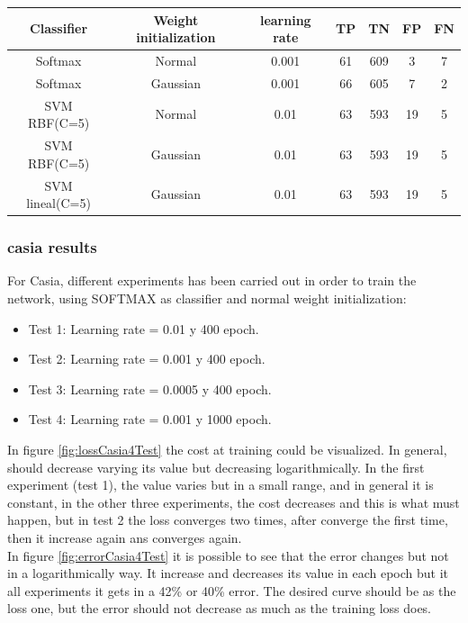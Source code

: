 \begin{table}[htb]
\centering
\label{fravv}
\begin{tabular}{|ccccccc|}
\hline
Classifier &  Weight initialization & learning rate & TP  & TN  & FP  & FN \\ \hline
Softmax    &         Normal        &     0.001     & 61  & 609 &  3  & 7  \\
Softmax    &       Gaussian        &     0.001     & 66  & 605 &  7  & 2   \\
SVM RBF(C=5)&         Normal       &     0.01      & 63  & 593 & 19  & 5  \\
SVM RBF(C=5)&         Gaussian     &     0.01      &  63 & 593 & 19  &5  \\
SVM lineal(C=5)&      Gaussian     &     0.01      &  63 & 593 & 19  &5  \\
\hline
\end{tabular}
\end{table}


\subsubsection{casia results}
For Casia, different experiments has been carried out in order to train the network, using SOFTMAX as classifier and normal weight initialization:\\

\begin{itemize}
\item{Test 1}: Learning rate = 0.01 y 400 epoch.
\item{Test 2}: Learning rate = 0.001 y 400 epoch.
\item{Test 3}: Learning rate = 0.0005 y 400 epoch.
\item{Test 4}: Learning rate = 0.001 y 1000 epoch.
\end{itemize}


In figure \ref{fig:lossCasia4Test} the cost at training could be visualized. In general, should decrease varying its value but decreasing logarithmically. In the first experiment (test 1), the value varies but in a small range, and in general it is constant, in the other three experiments, the cost decreases and this is what must happen, but in test 2 the loss converges two times, after converge the first time, then it increase again ans converges again.\\

In figure \ref{fig:errorCasia4Test} it is possible to see that the error changes but not in a logarithmically way. It increase and decreases its value in each epoch but it all experiments it gets in a 42\% or 40\% error. The desired curve should be as the loss one, but the error should not decrease as much as the training loss does.\\


